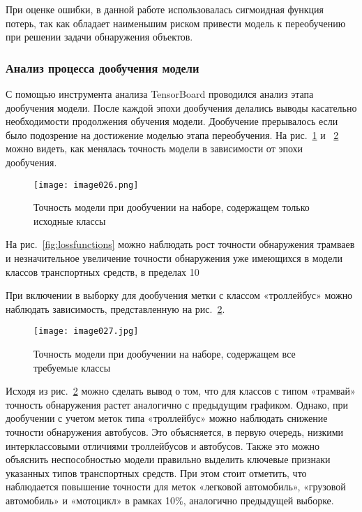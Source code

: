 При оценке ошибки, в данной работе использовалась сигмоидная функция потерь, так как обладает наименьшим риском привести модель к переобучению при решении задачи обнаружения объектов. 

\subsubsection{Анализ процесса дообучения модели}

С помощью инструмента анализа TensorBoard проводился анализ этапа дообучения модели. После каждой эпохи дообучения делались выводы касательно необходимости продолжения обучения модели. Дообучение прерывалось если было подозрение на достижение моделью этапа переобучения. На рис.~\ref{fig:image026} и ~\ref{fig:image027} можно видеть, как менялась точность модели в зависимости от эпохи дообучения.

\begin{figure}[htbp]
\centering
\texttt{[image: image026.png]}
\caption{Точность модели при дообучении на наборе, содержащем только исходные классы}%
\label{fig:image026}
\end{figure}

На рис.~\ref{fig:lossfunctions} можно наблюдать рост точности обнаружения трамваев и незначительное увеличение точности обнаружения уже имеющихся в модели классов транспортных средств, в пределах 10%

При включении в выборку для дообучения метки с классом «троллейбус» можно наблюдать зависимость, представленную на рис.~\ref{fig:image027}.

\begin{figure}[htbp]
\centering
\texttt{[image: image027.jpg]}
\caption{Точность модели при дообучении на наборе, содержащем все требуемые классы}%
\label{fig:image027}
\end{figure}

Исходя из рис.~\ref{fig:image027} можно сделать вывод о том, что для классов с типом «трамвай» точность обнаружения растет аналогично с предыдущим графиком. Однако, при дообучении с учетом меток типа «троллейбус» можно наблюдать снижение точности обнаружения автобусов. Это объясняется, в первую очередь, низкими интерклассовыми отличиями троллейбусов и автобусов. Также это можно объяснить неспособностью модели правильно выделить ключевые признаки указанных типов транспортных средств. При этом стоит отметить, что наблюдается повышение точности для меток «легковой автомобиль», «грузовой автомобиль» и «мотоцикл» в рамках 10\%, аналогично предыдущей выборке. 

